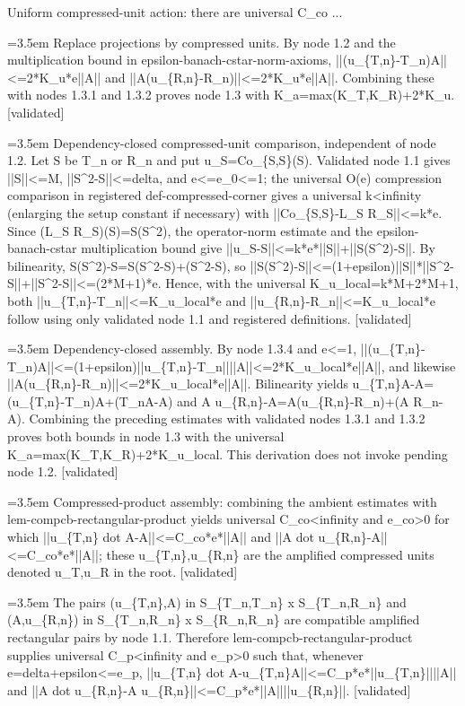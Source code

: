 \documentclass{article}
\newcommand{\step}[1]{\par\noindent\hangindent=3.5em\hangafter=1%
  \makebox[3.5em][l]{\textbf{#1.}}}
\newcommand{\steptag}[1]{\hfill{\small\textsf{[#1]}}}
\begin{document}
\begin{proofbox}{Uniform compressed-unit action: there are universal C\_co ...}
\step{1.3.3} Replace projections by compressed units. By node 1.2 and the multiplication bound in epsilon-banach-cstar-norm-axioms, ||(u\_\{T,n\}-T\_n)A||<=2*K\_u*e||A|| and ||A(u\_\{R,n\}-R\_n)||<=2*K\_u*e||A||. Combining these with nodes 1.3.1 and 1.3.2 proves node 1.3 with K\_a=max(K\_T,K\_R)+2*K\_u. \steptag{validated} \\[4pt]
\step{1.3.4} Dependency-closed compressed-unit comparison, independent of node 1.2. Let S be T\_n or R\_n and put u\_S=Co\_\{S,S\}(S). Validated node 1.1 gives ||S||<=M, ||S\textasciicircum{}2-S||<=delta, and e<=e\_0<=1; the universal O(e) compression comparison in registered def-compressed-corner gives a universal k<infinity (enlarging the setup constant if necessary) with ||Co\_\{S,S\}-L\_S R\_S||<=k*e. Since (L\_S R\_S)(S)=S(S\textasciicircum{}2), the operator-norm estimate and the epsilon-banach-cstar multiplication bound give ||u\_S-S||<=k*e*||S||+||S(S\textasciicircum{}2)-S||. By bilinearity, S(S\textasciicircum{}2)-S=S(S\textasciicircum{}2-S)+(S\textasciicircum{}2-S), so ||S(S\textasciicircum{}2)-S||<=(1+epsilon)||S||*||S\textasciicircum{}2-S||+||S\textasciicircum{}2-S||<=(2*M+1)*e. Hence, with the universal K\_u\_local=k*M+2*M+1, both ||u\_\{T,n\}-T\_n||<=K\_u\_local*e and ||u\_\{R,n\}-R\_n||<=K\_u\_local*e follow using only validated node 1.1 and registered definitions. \steptag{validated} \\[4pt]
\step{1.3.5} Dependency-closed assembly. By node 1.3.4 and e<=1, ||(u\_\{T,n\}-T\_n)A||<=(1+epsilon)||u\_\{T,n\}-T\_n||||A||<=2*K\_u\_local*e||A||, and likewise ||A(u\_\{R,n\}-R\_n)||<=2*K\_u\_local*e||A||. Bilinearity yields u\_\{T,n\}A-A=(u\_\{T,n\}-T\_n)A+(T\_nA-A) and A u\_\{R,n\}-A=A(u\_\{R,n\}-R\_n)+(A R\_n-A). Combining the preceding estimates with validated nodes 1.3.1 and 1.3.2 proves both bounds in node 1.3 with the universal K\_a=max(K\_T,K\_R)+2*K\_u\_local. This derivation does not invoke pending node 1.2. \steptag{validated} \\[4pt]
\step{1.4} Compressed-product assembly: combining the ambient estimates with lem-compcb-rectangular-product yields universal C\_co<infinity and e\_co>0 for which ||u\_\{T,n\} dot A-A||<=C\_co*e*||A|| and ||A dot u\_\{R,n\}-A||<=C\_co*e*||A||; these u\_\{T,n\},u\_\{R,n\} are the amplified compressed units denoted u\_T,u\_R in the root. \steptag{validated} \\[6pt]
\step{1.4.1} The pairs (u\_\{T,n\},A) in S\_\{T\_n,T\_n\} x S\_\{T\_n,R\_n\} and (A,u\_\{R,n\}) in S\_\{T\_n,R\_n\} x S\_\{R\_n,R\_n\} are compatible amplified rectangular pairs by node 1.1. Therefore lem-compcb-rectangular-product supplies universal C\_p<infinity and e\_p>0 such that, whenever e=delta+epsilon<=e\_p, ||u\_\{T,n\} dot A-u\_\{T,n\}A||<=C\_p*e*||u\_\{T,n\}||||A|| and ||A dot u\_\{R,n\}-A u\_\{R,n\}||<=C\_p*e*||A||||u\_\{R,n\}||. \steptag{validated} \\[4pt]

\end{proofbox}
\end{document}

